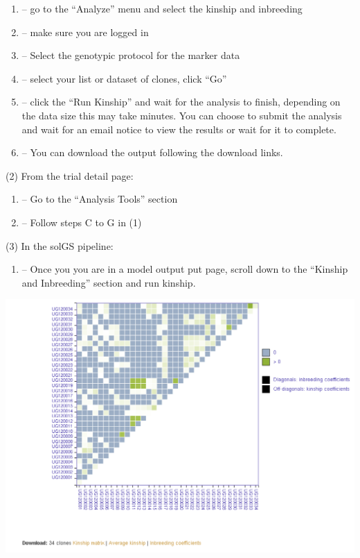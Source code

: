 \documentclass[
  12pt,
]{book}
\providecommand{\tightlist}{%
  \setlength{\itemsep}{0pt}\setlength{\parskip}{0pt}}
\begin{document}
\begin{enumerate}
\def\labelenumi{(\Alph{enumi})}
\item
  -- go to the ``Analyze'' menu and select the kinship and inbreeding
\item
  -- make sure you are logged in
\item
  -- Select the genotypic protocol for the marker data
\item
  -- select your list or dataset of clones, click ``Go''
\item
  -- click the ``Run Kinship'' and wait for the analysis to finish, depending on the data size this may take minutes. You can choose to submit the analysis and wait for an email notice to view the results or wait for it to complete.
\item
  -- You can download the output following the download links.
\end{enumerate}

(2) From the trial detail page:

\begin{enumerate}
\def\labelenumi{(\Alph{enumi})}
\item
  -- Go to the ``Analysis Tools'' section
\item
  -- Follow steps C to G in (1)
\end{enumerate}

(3) In the solGS pipeline:

\begin{enumerate}
\def\labelenumi{(\Alph{enumi})}
\tightlist
\item
  -- Once you you are in a model output put page, scroll down to the ``Kinship and Inbreeding'' section and run kinship.
\end{enumerate}

\begin{center}\includegraphics[width=0.95\linewidth]{assets/images/kinship-inbreeding} \end{center}
\end{document}
